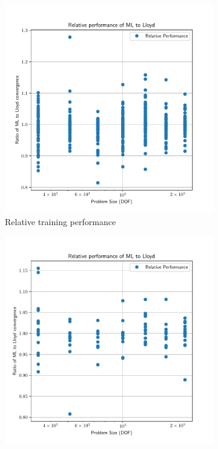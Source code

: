 \documentclass{article}
\begin{document}
\begin{figure}[h!]
  \centering
  \begin{subfigure}[t]{0.47\textwidth}
    \centering
    \includegraphics[width=\textwidth]{aniso3d_train_rel_perf.pdf}
    \caption{Relative training performance}
  \end{subfigure}
  \begin{subfigure}[t]{0.47\textwidth}
    \centering
    \includegraphics[width=\textwidth]{aniso3d_test_rel_perf.pdf}

\end{subfigure}
\end{figure}
\end{document}
